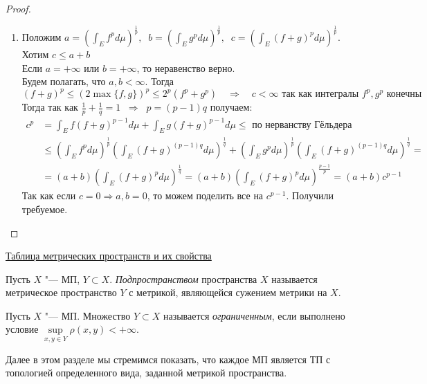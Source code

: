 \begin{proof}
\begin{enumerate}
    \item Положим $a = \left(\int_Ef^pd\mu\right)^{\frac 1p}, \;\; b = \left(\int_Eg^pd\mu\right)^{\frac 1p}, \;\; c = \left(\int_E(f + g)^pd\mu\right)^{\frac 1p}$. Хотим $c \leqslant a + b$ \\
    Если $a = +\infty$ или $b =+\infty$, то неравенство верно. \\
    Будем полагать, что $a, b < \infty$. Тогда 
    \[(f+g)^p \leqslant (2  \max\{f,g\})^p \leqslant 2^p (f^p + g^p) \quad \Rightarrow \quad c < \infty \text{  так как интегралы $f^p, g^p$ конечны}\]
    Тогда так как $\frac{1}{p} + \frac{1}{q} = 1 \;\; \Rightarrow \;\; p = (p-1)q$ получаем:
    \begin{align*}
        c^p &= \int_Ef(f+g)^{p-1}d\mu + \int_Eg(f+g)^{p-1}d\mu \leqslant \text{ по нерванству Гёльдера} \\
        &\leqslant \left(\int_Ef^pd\mu\right)^{\frac{1}{p}} \left(\int_E(f+g)^{(p-1)q}d\mu\right)^{\frac{1}{q}} +
        \left(\int_Eg^pd\mu\right)^{\frac{1}{p}} \left(\int_E(f+g)^{(p-1)q}d\mu\right)^{\frac{1}{q}} = \\
        & = (a + b) \left(\int_E(f+g)^{p}d\mu\right)^{\frac{1}{q}} = (a + b) \left(\int_E(f+g)^{p}d\mu\right)^{\frac{p-1}{p}} = (a + b) c^{p-1}
    \end{align*}
    Так как если $c = 0 \Rightarrow a,b=0$, то можем поделить все на $c^{p-1}$. Получили требуемое.
\end{enumerate}
\end{proof}

\begin{example}
    \hyperref[sec:table_of_examples]{Таблица метрических пространств и их свойства}
\end{example}




\begin{definition}
	Пусть $X$ "--- МП, $Y \subset X$. \textit{Подпространством} пространства $X$ называется метрическое пространство $Y$ с метрикой, являющейся сужением метрики на $X$.
\end{definition}

\begin{definition}
	Пусть $X$ "--- МП. Множество $Y \subset X$ называется \textit{ограниченным}, если выполнено условие $\sup\limits_{x, y \in Y} \rho(x, y) < +\infty$.
\end{definition}

\begin{note}
	Далее в этом разделе мы стремимся показать, что каждое МП является ТП с топологией определенного вида, заданной метрикой пространства.
\end{note}

